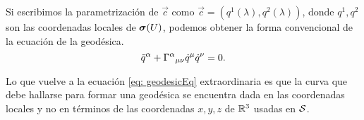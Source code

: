 \begin{remark}
	Si escribimos la parametrización de $\vec c$ como $\vec c = (q^1(\lambda), q^2(\lambda))$, donde $q^1, q^2$ son las coordenadas locales de $\boldsymbol{\sigma}(U)$, podemos obtener la forma convencional de la ecuación de la geodésica.
	\begin{equation}
		\ddot q^\alpha +  {\Gamma^{\alpha}}_{\mu\nu} \dot q^\mu\dot q^\nu = 0.
	\end{equation}
\end{remark}

\begin{remark}
	Lo que vuelve a la ecuación \eqref{eq: geodesicEq} extraordinaria es que la curva que debe hallarse para formar una geodésica se encuentra dada en las coordenadas locales y no en términos de las coordenadas $x, y, z$ de $\mathbb R^3$ usadas en $\mathcal S$.
\end{remark}